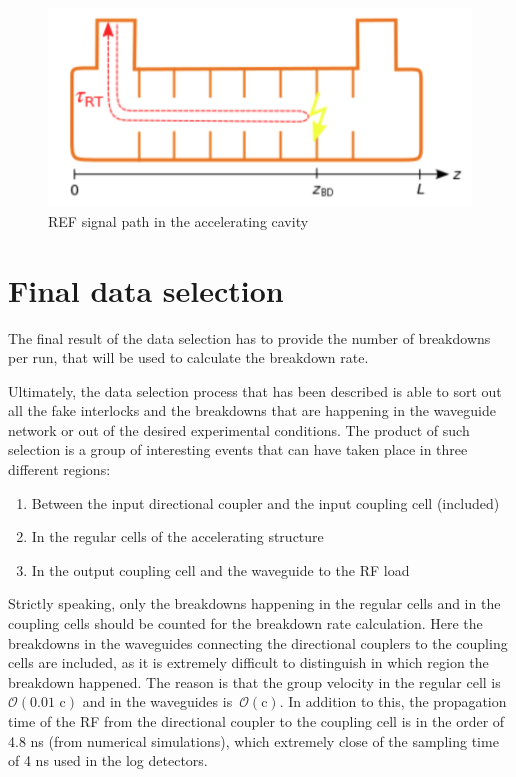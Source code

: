 \begin{figure}[h]
\centering 
\includegraphics[scale=0.3]{pictures/tToz}
\caption{REF signal path in the accelerating cavity}
\label{tToz_p}
\end{figure}




\section[Final data selection]{Final data selection}
\label{sec:BDR}

The final result of the data selection has to provide the number of breakdowns per run, that will be used to calculate the breakdown rate. 

Ultimately, the data selection process that has been described is able to sort out all the fake interlocks and the breakdowns that are happening in the waveguide network or out of the desired experimental conditions. The product of such selection is a group of interesting events that can have taken place in three different regions:
\begin{enumerate}
\item Between the input directional coupler and the input coupling cell (included)
\item In the regular cells of the accelerating structure
\item In the output coupling cell and the waveguide to the RF load
\end{enumerate}
Strictly speaking, only the breakdowns happening in the regular cells and in the coupling cells should be counted for the breakdown rate calculation. Here the breakdowns in the waveguides connecting the directional couplers to the coupling cells are included, as it is extremely difficult to distinguish in which region the breakdown happened. The reason is that the group velocity in the regular cell is $\mathcal{O}(\text{0.01 c})$ and in the waveguides is~$\mathcal{O}(\text{c})$. In addition to this, the propagation time of the RF from the directional coupler to the coupling cell is in the order of 4.8 ns (from numerical simulations), which extremely close of the sampling time of 4 ns used in the log detectors. 

